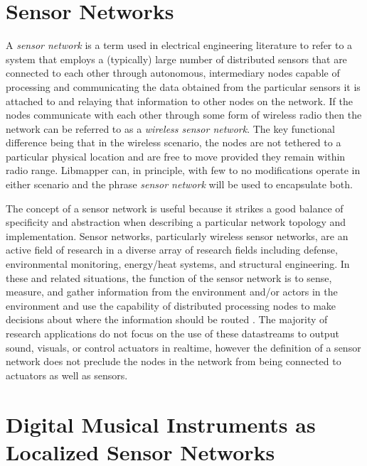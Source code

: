 \section{Sensor Networks}

A \emph{sensor network} is a term used in electrical engineering literature to refer to a system that employs a (typically) large number of distributed sensors that are connected to each other through autonomous, intermediary nodes capable of processing and communicating the data obtained from the particular sensors it is attached to and relaying that information to other nodes on the network. If the nodes communicate with each other through some form of wireless radio then the network can be referred to as a \emph{wireless sensor network}. The key functional difference being that in the wireless scenario, the nodes are not tethered to a particular physical location and are free to move provided they remain within radio range. Libmapper can, in principle, with few to no modifications operate in either scenario and the phrase \emph{sensor network} will be used to encapsulate both.

The concept of a sensor network is useful because it strikes a good balance of specificity and abstraction when describing a particular network topology and implementation. Sensor networks, particularly wireless sensor networks, are an active field of research in a diverse array of research fields including defense, environmental monitoring, energy/heat systems, and structural engineering. In these and related situations, the function of the sensor network is to sense, measure, and gather information from the environment and/or actors in the environment and use the capability of distributed processing nodes to make decisions about where the information should be routed \cite{survey2008}. The majority of research applications do not focus on the use of these datastreams to output sound, visuals, or control actuators in realtime, however the definition of a sensor network does not preclude the nodes in the network from being connected to actuators as well as sensors.

\section{Digital Musical Instruments as Localized Sensor Networks}

